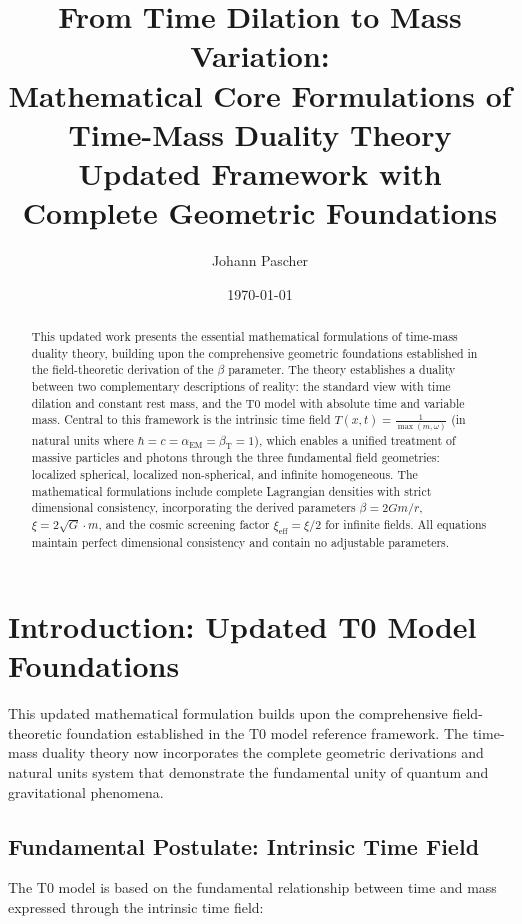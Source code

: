 \documentclass[12pt,a4paper]{article}
\title{From Time Dilation to Mass Variation: \\ Mathematical Core Formulations of Time-Mass Duality Theory \\ \large Updated Framework with Complete Geometric Foundations}
\author{Johann Pascher}
\date{\today}
\newcommand{\Tfield}{T(x,t)}
\theoremstyle{definition}
\theoremstyle{remark}
\begin{document}
	
	\maketitle
	
	\begin{abstract}
		This updated work presents the essential mathematical formulations of time-mass duality theory, building upon the comprehensive geometric foundations established in the field-theoretic derivation of the $\beta$ parameter. The theory establishes a duality between two complementary descriptions of reality: the standard view with time dilation and constant rest mass, and the T0 model with absolute time and variable mass. Central to this framework is the intrinsic time field $\Tfield = \frac{1}{\max(m, \omega)}$ (in natural units where $\hbar = c = \alpha_{\text{EM}} = \beta_{\text{T}} = 1$), which enables a unified treatment of massive particles and photons through the three fundamental field geometries: localized spherical, localized non-spherical, and infinite homogeneous. The mathematical formulations include complete Lagrangian densities with strict dimensional consistency, incorporating the derived parameters $\beta = 2Gm/r$, $\xi = 2\sqrt{G} \cdot m$, and the cosmic screening factor $\xi_{\text{eff}} = \xi/2$ for infinite fields. All equations maintain perfect dimensional consistency and contain no adjustable parameters.
	\end{abstract}
	
	\tableofcontents
	\newpage
	
	\section{Introduction: Updated T0 Model Foundations}
	
	This updated mathematical formulation builds upon the comprehensive field-theoretic foundation established in the T0 model reference framework. The time-mass duality theory now incorporates the complete geometric derivations and natural units system that demonstrate the fundamental unity of quantum and gravitational phenomena.
	
	\subsection{Fundamental Postulate: Intrinsic Time Field}
	\label{subsec:fundamental_postulate}
	
	The T0 model is based on the fundamental relationship between time and mass expressed through the intrinsic time field:
	
\end{document}
